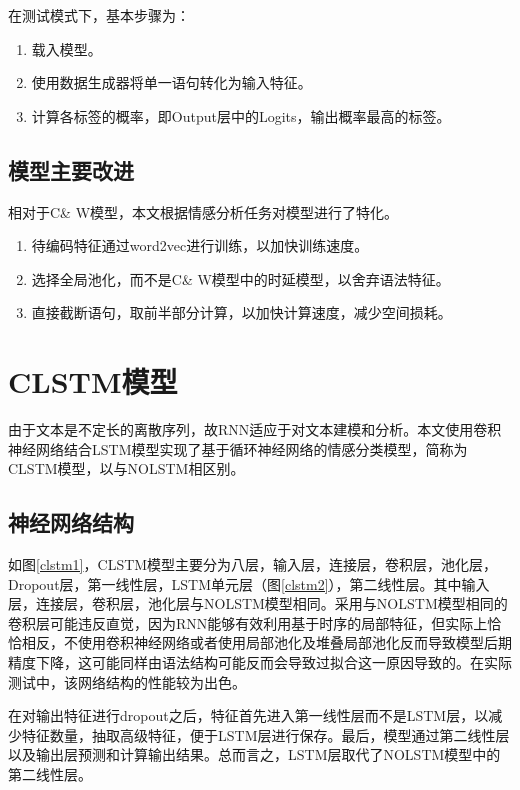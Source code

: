 在测试模式下，基本步骤为：


\begin{enumerate}
\item 载入模型。
\item 使用数据生成器将单一语句转化为输入特征。
\item 计算各标签的概率，即Output层中的Logits，输出概率最高的标签。
\end{enumerate}
\subsection{模型主要改进}
相对于C\& W模型，本文根据情感分析任务对模型进行了特化。
\begin{enumerate}
\item 待编码特征通过word2vec进行训练，以加快训练速度。
\item 选择全局池化，而不是C\& W模型中的时延模型，以舍弃语法特征。
\item 直接截断语句，取前半部分计算，以加快计算速度，减少空间损耗。
\end{enumerate}
\section{CLSTM模型}
由于文本是不定长的离散序列，故RNN适应于对文本建模和分析。本文使用卷积神经网络结合LSTM模型实现了基于循环神经网络的情感分类模型，简称为CLSTM模型，以与NOLSTM相区别。
\subsection{神经网络结构}
如图\ref{clstm1}，CLSTM模型主要分为八层，输入层，连接层，卷积层，池化层，Dropout层，第一线性层，LSTM单元层（图\ref{clstm2}），第二线性层。其中输入层，连接层，卷积层，池化层与NOLSTM模型相同。采用与NOLSTM模型相同的卷积层可能违反直觉，因为RNN能够有效利用基于时序的局部特征，但实际上恰恰相反，不使用卷积神经网络或者使用局部池化及堆叠局部池化反而导致模型后期精度下降，这可能同样由语法结构可能反而会导致过拟合这一原因导致的。在实际测试中，该网络结构的性能较为出色。\par
在对输出特征进行dropout之后，特征首先进入第一线性层而不是LSTM层，以减少特征数量，抽取高级特征，便于LSTM层进行保存。最后，模型通过第二线性层以及输出层预测和计算输出结果。总而言之，LSTM层取代了NOLSTM模型中的第二线性层。

